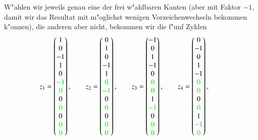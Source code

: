 W"ahlen wir jeweils genau
eine der frei w"ahlbaren Kanten (aber mit Faktor $-1$, damit wir das Resultat
mit m"oglichst wenigen Vorzeichenwechseln bekommen k"onnen),
die anderen aber nicht, bekommen wir die f"unf Zyklen
\[
z_1=\begin{pmatrix}  1\\ 0\\-1\\ 1\\ 0\\\color{green}-1\\\color{green} 0\\ 0\\\color{green} 0\\ 0\\\color{green} 0\\\color{green} 0\end{pmatrix},\qquad
z_2=\begin{pmatrix}  0\\ 1\\ 0\\-1\\ 1\\\color{green} 0\\\color{green}-1\\ 0\\\color{green} 0\\ 0\\\color{green} 0\\\color{green} 0\end{pmatrix},\qquad
z_3=\begin{pmatrix} -1\\ 0\\ 1\\-1\\ 0\\\color{green} 0\\\color{green} 0\\ 1\\\color{green}-1\\ 0\\\color{green} 0\\\color{green} 0\end{pmatrix},\qquad
z_4=\begin{pmatrix}  0\\-1\\ 0\\ 1\\-1\\\color{green} 0\\\color{green} 0\\ 0\\\color{green} 0\\ 1\\\color{green}-1\\\color{green} 0\end{pmatrix},\qquad
\]
